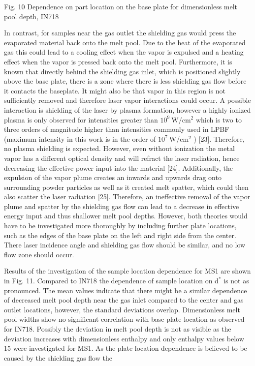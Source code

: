 \documentclass[10pt]{article}
\begin{document}
Fig. 10 Dependence on part location on the base plate for dimensionless melt pool depth, IN718

In contrast, for samples near the gas outlet the shielding gas would press the evaporated material back onto the melt pool. Due to the heat of the evaporated gas this could lead to a cooling effect when the vapor is expulsed and a heating effect when the vapor is pressed back onto the melt pool. Furthermore, it is known that directly behind the shielding gas inlet, which is positioned slightly above the base plate, there is a zone where there is less shielding gas flow before it contacts the baseplate. It might also be that vapor in this region is not sufficiently removed and therefore laser vapor interactions could occur. A possible interaction is shielding of the laser by plasma formation, however a highly ionized plasma is only observed for intensities greater than $10^{9} \mathrm{~W} / \mathrm{cm}^{2}$ which is two to three orders of magnitude higher than intensities commonly used in LPBF (maximum intensity in this work is in the order of $10^{7} \mathrm{~W} / \mathrm{cm}^{2}$ ) [23]. Therefore, no plasma shielding is expected. However, even without ionization the metal vapor has a different optical density and will refract the laser radiation, hence decreasing the effective power input into the material [24]. Additionally, the expulsion of the vapor plume creates an inwards and upwards drag onto surrounding powder particles as well as it created melt spatter, which could then also scatter the laser radiation [25]. Therefore, an ineffective removal of the vapor plume and spatter by the shielding gas flow can lead to a decrease in effective energy input and thus shallower melt pool depths. However, both theories would have to be investigated more thoroughly by including further plate locations, such as the edges of the base plate on the left and right side from the center. There laser incidence angle and shielding gas flow should be similar, and no low flow zone should occur.

Results of the investigation of the sample location dependence for MS1 are shown in Fig. 11. Compared to IN718 the dependence of sample location on $\mathrm{d}^{*}$ is not as pronounced. The mean values indicate that there might be a similar dependence of decreased melt pool depth near the gas inlet compared to the center and gas outlet locations, however, the standard deviations overlap. Dimensionless melt pool widths show no significant correlation with base plate location as observed for IN718. Possibly the deviation in melt pool depth is not as visible as the deviation increases with dimensionless enthalpy and only enthalpy values below 15 were investigated for MS1. As the plate location dependence is believed to be caused by the shielding gas flow the
\end{document}
